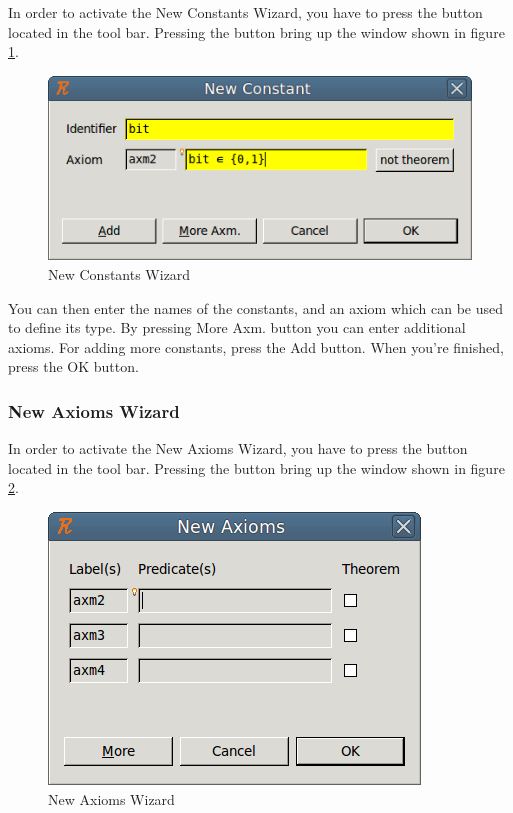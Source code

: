 In order to activate the \textsf{New Constants Wizard}, you have to press the  button located in the tool bar. Pressing the button bring up the window shown in figure \ref{fig_ref_01_eventb_editor6}.

\begin{figure}[!h]
\begin{center}
	\includegraphics{img/reference/ref_01_eventb_editor6.png}
	\caption{New Constants Wizard}
	\label{fig_ref_01_eventb_editor6}
\end{center}
\end{figure}

You can then enter the names of the constants, and an axiom which can be used to define its type. By pressing \textsf{More Axm.} button you can enter additional axioms. For adding more constants, press the \textsf{Add} button. When you’re finished, press the \textsf{OK} button.

\subsubsection{New Axioms Wizard}

In order to activate the \textsf{New Axioms Wizard}, you have to press the  button located in the tool bar. Pressing the button bring up the window shown in figure \ref{fig_ref_01_eventb_editor7}.

\begin{figure}[!h]
\begin{center}
	\includegraphics{img/reference/ref_01_eventb_editor7.png}
	\caption{New Axioms Wizard}
	\label{fig_ref_01_eventb_editor7}
\end{center}
\end{figure}

